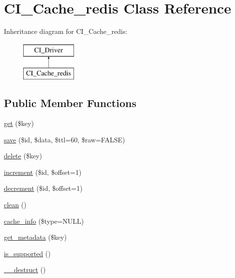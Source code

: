 \hypertarget{class_c_i___cache__redis}{}\section{C\+I\+\_\+\+Cache\+\_\+redis Class Reference}
\label{class_c_i___cache__redis}
Inheritance diagram for C\+I\+\_\+\+Cache\+\_\+redis\+:\begin{figure}[H]
\begin{center}
\leavevmode
\includegraphics[height=2.000000cm]{class_c_i___cache__redis}
\end{center}
\end{figure}
\subsection*{Public Member Functions}
\begin{DoxyCompactItemize}
\item 
\hyperlink{class_c_i___cache__redis_a24a9bf83a1002d46ece83a93d14bd921}{get} (\$key)
\item 
\hyperlink{class_c_i___cache__redis_a472645db04a8ce4b040b789a3062a7d2}{save} (\$id, \$data, \$ttl=60, \$raw=F\+A\+L\+S\+E)
\item 
\hyperlink{class_c_i___cache__redis_aa74a2edd6f3cbb5c5353f7faa97b6d70}{delete} (\$key)
\item 
\hyperlink{class_c_i___cache__redis_a2f07a4e09b57f4460d49852497d1808f}{increment} (\$id, \$offset=1)
\item 
\hyperlink{class_c_i___cache__redis_a4eb1c2772c8efc48c411ea060dd040b7}{decrement} (\$id, \$offset=1)
\item 
\hyperlink{class_c_i___cache__redis_adb40b812890a8bc058bf6b7a0e1a54d9}{clean} ()
\item 
\hyperlink{class_c_i___cache__redis_aa8b9c4d9f0387156736ccd8850f0727e}{cache\+\_\+info} (\$type=N\+U\+L\+L)
\item 
\hyperlink{class_c_i___cache__redis_ae0041475d947465622dfcef1fc53e43d}{get\+\_\+metadata} (\$key)
\item 
\hyperlink{class_c_i___cache__redis_a98c68fd153468bc148c4ed8c716859fc}{is\+\_\+supported} ()
\item 
\hyperlink{class_c_i___cache__redis_a421831a265621325e1fdd19aace0c758}{\+\_\+\+\_\+destruct} ()
\end{DoxyCompactItemize}
